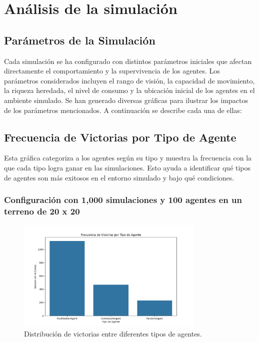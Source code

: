 \documentclass[11pt]{article}
\begin{document}
\section{Análisis de la simulación}
\subsection{Parámetros de la Simulación}
Cada simulación se ha configurado con distintos parámetros iniciales que afectan directamente el comportamiento y la supervivencia de los agentes. Los parámetros considerados incluyen el rango de visión, la capacidad de movimiento, la riqueza heredada, el nivel de consumo y la ubicación inicial de los agentes en el ambiente simulado.
Se han generado diversas gráficas para ilustrar los impactos de los parámetros mencionados. A continuación se describe cada una de ellas:

\subsection{Frecuencia de Victorias por Tipo de Agente}
Esta gráfica categoriza a los agentes según su tipo y muestra la frecuencia con la que cada tipo logra ganar en las simulaciones. Esto ayuda a identificar qué tipos de agentes son más exitosos en el entorno simulado y bajo qué condiciones.

\subsubsection{Configuración con 1,000 simulaciones y 100 agentes en un terreno de 20 x 20}
\begin{figure}[H]
    \centering
    \includegraphics[width=0.8\textwidth]{images/Figure_1.png}
    \caption{Distribución de victorias entre diferentes tipos de agentes.}
\end{figure}
\end{document}
